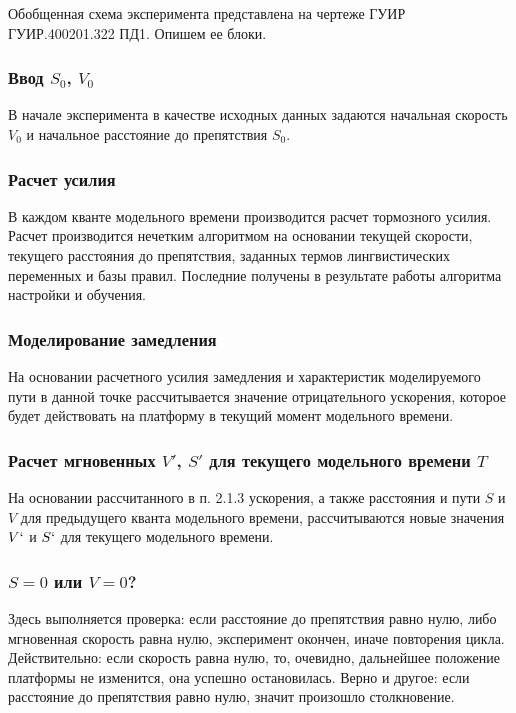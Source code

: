 Обобщенная схема эксперимента представлена на чертеже ГУИР ГУИР.400201.322 ПД1. Опишем ее блоки.

\subsubsection{Ввод $S_0$, $V_0$}

В начале эксперимента в качестве исходных данных задаются начальная скорость $V_0$ и начальное расстояние до препятствия $S_0$.

\subsubsection{Расчет усилия }

В каждом кванте модельного времени производится расчет тормозного усилия. Расчет производится нечетким алгоритмом на основании текущей скорости, текущего расстояния до препятствия, заданных термов лингвистических переменных и базы правил. Последние получены в результате работы алгоритма настройки и обучения.

\subsubsection{ Моделирование замедления}

На основании расчетного усилия  замедления и характеристик моделируемого пути в данной точке рассчитывается значение отрицательного ускорения, которое будет действовать на платформу в текущий момент модельного времени.

\subsubsection{Расчет мгновенных $V'$, $S'$ для текущего модельного времени $T$}

На основании рассчитанного в п. 2.1.3 ускорения, а также расстояния и пути $S$ и $V$ для предыдущего кванта модельного времени, рассчитываются новые значения $V`$ и $S`$ для текущего модельного времени.

\subsubsection{ $S = 0$ или $V = 0$? }
Здесь выполняется проверка: если расстояние до препятствия равно нулю, либо мгновенная скорость равна нулю, эксперимент окончен, иначе повторения цикла. Действительно: если скорость равна нулю, то, очевидно, дальнейшее положение платформы не изменится, она успешно остановилась. Верно и другое: если расстояние до препятствия равно нулю, значит произошло столкновение.

